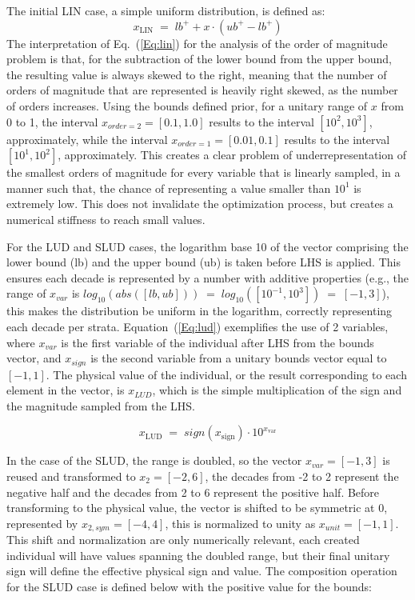 \documentclass[10pt,fleqn,a4paper,twoside]{article}
\begin{document}
The initial LIN case, a simple uniform distribution, is defined as:
\begin{equation}
    x_{\mathrm{LIN}}\;=\; lb^+ + x \cdot (ub^+ - lb^+)
    \label{Eq:lin}
\end{equation}
The interpretation of Eq.~(\ref{Eq:lin}) for the analysis of the order of magnitude problem is that, for the subtraction of the lower bound from the upper bound, the resulting value is always skewed to the right, meaning that the number of orders of magnitude that are represented is heavily right skewed, as the number of orders increases. Using the bounds defined prior, for a unitary range of $x$ from 0 to 1, the interval $x_{order=2}= [0.1, 1.0] $ results to the interval $[10^{2}, 10^{3}]$, approximately, while the interval $x_{order=1}= [0.01, 0.1] $ results to the interval $[10^{1}, 10^{2}]$, approximately. This creates a clear problem of underrepresentation of the smallest orders of magnitude for every variable that is linearly sampled, in a manner such that, the chance of representing a value smaller than $10^{1}$ is extremely low. This does not invalidate the optimization process, but creates a numerical stiffness to reach small values.

For the LUD and SLUD cases, the logarithm base 10 of the vector comprising the lower bound (lb) and the upper bound (ub) is taken before LHS is applied. This ensures each decade is represented by a number with additive properties
(e.g., the range of $x_{var}$ is $log_{10}(abs([{lb, ub}])) \;=\; log_{10}([10^{-1}, 10^{3}])\;=\; [-1,3]$), this makes the distribution be uniform in the logarithm, correctly representing each decade per strata. Equation~(\ref{Eq:lud})
exemplifies the use of 2 variables, where $x_{var}$ is the first variable of the individual after LHS from the bounds vector, and $x_{sign}$ is the second variable from a unitary bounds vector equal to 
$[-1, 1]$. The physical value of the individual, or the result corresponding to each element in the vector, is $x_{LUD}$, which is the simple multiplication of the sign and the magnitude sampled from the LHS.

\begin{equation}
    x_{\mathrm{LUD}}\;=\;   sign(x_{\mathrm{sign}}) \cdot 10^{x_{\mathrm{var}}}
    \label{Eq:lud}
\end{equation}

In the case of the SLUD, the range is doubled, so the vector $x_{var}=[-1,3]$ is reused and transformed to $x_2=[-2,6]$, the decades from -2 to 2 represent the negative half and the decades from 2 to 6 represent the positive half.
Before transforming to the physical value, the vector is shifted to be symmetric at 0, represented by $x_{2,sym}=[-4,4]$, this is normalized to unity as $x_{unit}=[-1,1]$. This shift and normalization are only numerically relevant, each created
individual will have values spanning the doubled range, but their final unitary sign will define the effective physical sign and value. 
The composition operation for the SLUD case is defined below with the positive value for the bounds:
\end{document}
